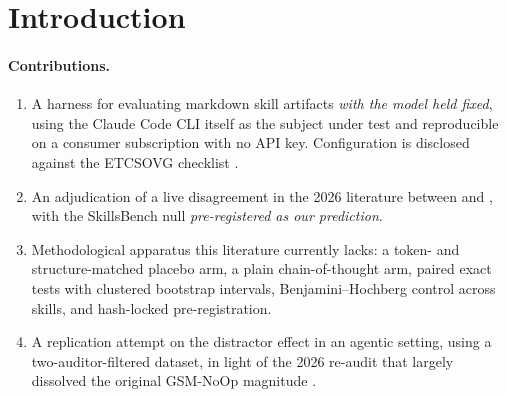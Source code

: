 \section{Introduction}
\label{sec:intro}

%
%


\paragraph{Contributions.}
\begin{enumerate}
  \item A harness for evaluating markdown skill artifacts \emph{with the model
    held fixed}, using the Claude Code CLI itself as the subject under test and
    reproducible on a consumer subscription with no API key. Configuration is
    disclosed against the ETCSOVG checklist \citep{harnessdisclosure2026}.
  \item An adjudication of a live disagreement in the 2026 literature between
    \citet{skillsbench2026} and \citet{skillopt2026}, with the SkillsBench null
    \emph{pre-registered as our prediction}.
  \item Methodological apparatus this literature currently lacks: a
    token- and structure-matched placebo arm, a plain chain-of-thought arm,
    paired exact tests with clustered bootstrap intervals, Benjamini--Hochberg
    control across skills, and hash-locked pre-registration.
  \item A replication attempt on the distractor effect in an agentic setting,
    using a two-auditor-filtered dataset, in light of the 2026 re-audit that
    largely dissolved the original GSM-NoOp magnitude \citep{gsmsymbolic2024}.
\end{enumerate}
